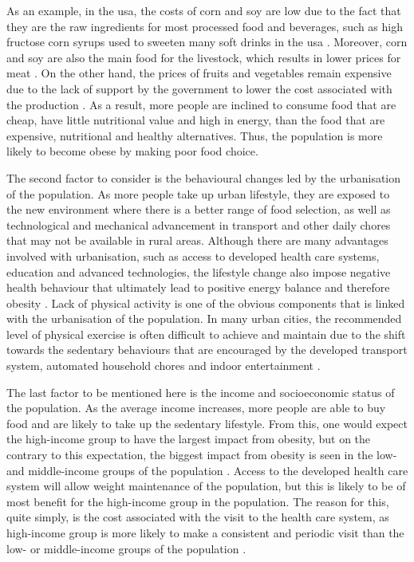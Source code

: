 As an example, in the \gls{usa}, the costs of corn and soy are low due to the fact that they are the raw ingredients for most processed food and beverages, such as high fructose corn syrups used to sweeten many soft drinks in the \gls{usa} \citep{Malik2013}.
Moreover, corn and soy are also the main food for the livestock, which results in lower prices for meat \citep{Malik2013}.
On the other hand, the prices of fruits and vegetables remain expensive due to the lack of support by the government to lower the cost associated with the production \citep{Malik2013}.
As a result, more people are inclined to consume food that are cheap, have little nutritional value and high in energy, than the food that are expensive, nutritional and healthy alternatives.
Thus, the population is more likely to become obese by making poor food choice.

The second factor to consider is the behavioural changes led by the urbanisation of the population.
As more people take up urban lifestyle, they are exposed to the new environment where there is a better range of food selection, as well as technological and mechanical advancement in transport and other daily chores that may not be available in rural areas.
Although there are many advantages involved with urbanisation, such as access to developed health care systems, education and advanced technologies, the lifestyle change also impose negative health behaviour that ultimately lead to positive energy balance and therefore obesity \citep{Malik2013}.
Lack of physical activity is one of the obvious components that is linked with the urbanisation of the population.
In many urban cities, the recommended level of physical exercise is often difficult to achieve and maintain due to the shift towards the sedentary behaviours that are encouraged by the developed transport system, automated household chores and indoor entertainment \citep{Malik2013}.

The last factor to be mentioned here is the income and socioeconomic status of the population.
As the average income increases, more people are able to buy food and are likely to take up the sedentary lifestyle.
From this, one would expect the high-income group to have the largest impact from obesity, but on the contrary to this expectation, the biggest impact from obesity is seen in the low- and middle-income groups of the population \citep{Malik2013}.
Access to the developed health care system will allow weight maintenance of the population, but this is likely to be of most benefit for the high-income group in the population.
The reason for this, quite simply, is the cost associated with the visit to the health care system, as high-income group is more likely to make a consistent and periodic visit than the low- or middle-income groups of the population \citep{Malik2013}.

